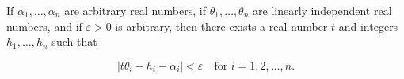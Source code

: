 If $\alpha_1, \ldots, \alpha_n$ are arbitrary real numbers, if $\theta_1, \ldots, \theta_n$ are linearly independent real numbers, and if $\varepsilon > 0$ is arbitrary, then there exists a real number $t$ and integers $h_1, \ldots, h_n$ such that

$$|t\theta_i - h_i - \alpha_i| < \varepsilon \quad \text{for } i = 1, 2, \ldots, n.$$
